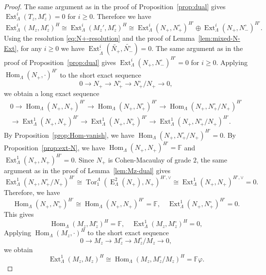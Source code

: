 \documentclass[11pt,a4paper]{article} %
\def\FF{\mathbb{F}}
\def\E{\operatorname{E}}
\def\Ext{\operatorname{Ext}} %
\def\Hom{\operatorname{Hom}}
\def\Tor{\operatorname{Tor}}
\begin{document}
\begin{proof}
    The same argument as in the proof of Proposition~\ref{prop:dual} gives $\Ext^i_{\Lambda}(T_z,M_z^\circ)=0$ for $i\ge0$. Therefore we have
    \[
    \Ext^i_{\Lambda}(M_z,M_z^\circ)^H\cong\Ext^i_{\Lambda}(M_z',M_z^\circ)^H\cong\Ext^i_{\Lambda}(N_+,N^\circ_+)^{H'}\oplus\Ext^i_{\Lambda}(N_+,N_-^\circ)^{H'}.
    \]
    Using the resolution \eqref{eq:N+-resolution} and the proof of Lemma~\ref{lem:mixed-N-Ext}, for any $i\ge0$ we have $\Ext_{\widetilde{\Lambda}}^i\left(\widetilde{N_+},\widetilde{N_-^\circ}\right)=0$. The same argument as in the proof of Proposition~\ref{prop:dual} gives $\Ext^i_{\Lambda}(N_+,N_-^\circ)^{H'}=0$ for $i\ge0$. Applying $\Hom_{\Lambda}(N_+,\cdot)^{H'}$ to the short exact sequence
    \[
    0\longrightarrow N_+\longrightarrow N_+^\circ\longrightarrow N_+^\circ/N_+\longrightarrow0,
    \]
    we obtain a long exact sequence
    \[
    \begin{split}
         0\longrightarrow\Hom_{\Lambda}(N_+,N_+)^{H'}\longrightarrow\Hom_{\Lambda}(N_+,N_+^\circ)^{H'}\longrightarrow\Hom_{\Lambda}(N_+,N_+^\circ/N_+)^{H'}\\
         \longrightarrow\Ext^1_{\Lambda}(N_+,N_+)^{H'}\longrightarrow\Ext^1_{\Lambda}(N_+,N_+^\circ)^{H'}\longrightarrow\Ext^1_{\Lambda}(N_+,N_+^\circ/N_+)^{H'}.
    \end{split}
    \]
    By Proposition~\ref{prop:Hom-vanish}, we have $\Hom_{\Lambda}(N_+,N_+^\circ/N_+)^{H'}=0$. By Proposition~\ref{prop:ext-N}, we have $\Hom_{\Lambda}(N_+,N_+)^{H'}=\FF$ and $\Ext^1_{\Lambda}(N_+,N_+)^{H'}=0$. Since $N_+$ is Cohen-Macaulay of grade $2$, the same argument as in the proof of Lemma~\ref{lem:Mz-dual} gives
    \[
    \Ext^1_{\Lambda}(N_+,N_+^\circ/N_+)^{H'}\cong\Tor^\Lambda_1\left(\E^2_\Lambda(N_+),N_+\right)^{H',\vee}\cong\Ext^1_{\Lambda}(N_+,N_+)^{H',\vee}=0.
    \]
    Therefore, we have
    \[
    \Hom_{\Lambda}(N_+,N_+^\circ)^{H'}\cong\Hom_{\Lambda}(N_+,N_+)^{H'}=\FF,\quad\Ext^1_{\Lambda}(N_+,N_+^\circ)^{H'}=0.
    \]
    This gives
    \[
    \Hom_{\Lambda}(M_z,M_z^\circ)^H=\FF,\quad\Ext^1_{\Lambda}(M_z,M_z^\circ)^H=0,
    \]
    Applying $\Hom_{\Lambda}(M_z,\cdot)^H$ to the short exact sequence
    \[
    0\longrightarrow M_z\longrightarrow M_z^\circ\longrightarrow M_z^\circ/M_z\longrightarrow0,
    \]
    we obtain 
    \[   
    \Ext^1_{\Lambda}(M_z,M_z)^H\cong\Hom_{\Lambda}(M_z,M_z^\circ/M_z)^H=\FF\varphi.
    \]
\end{proof}
\end{document}
